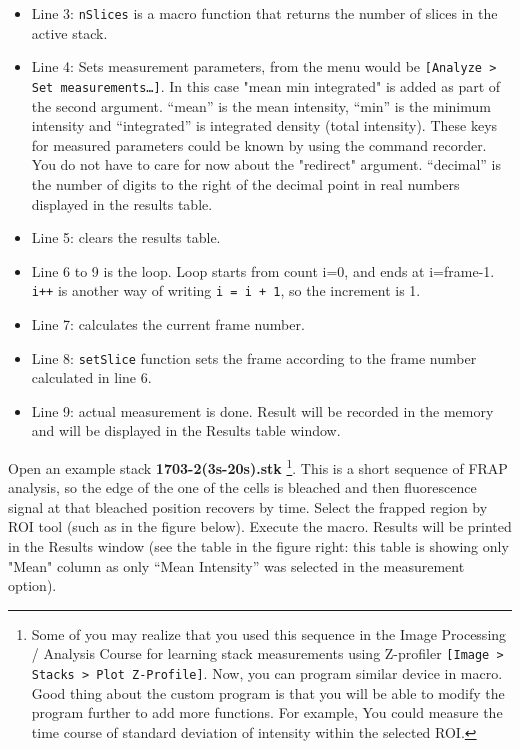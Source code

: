 \documentclass[11pt,a4paper,oneside]{report}
\newcommand{\ilcom}[1]{\texttt{\small#1}}
\begin{document}
\begin{itemize}
\item Line 3: \ilcom{nSlices} is a macro function that returns the number of slices in the active stack. 

\item Line 4: Sets measurement parameters, from the menu would be \ilcom{[Analyze > Set measurements\ldots]}. In this case "mean min integrated" is added as part of the second argument. ``mean'' is the mean intensity, ``min'' is the minimum intensity and ``integrated'' is integrated density (total intensity). These keys for measured parameters could be known by using the command recorder. 
You do not have to care for now about the "redirect" argument. ``decimal'' is the number of digits to 
the right of the decimal point in real numbers displayed in the results table. 

\item Line 5: clears the results table. 

\item Line 6 to 9 is the loop. Loop starts from count i=0, and ends at i=frame-1. \ilcom{i++} is another way of writing \ilcom{i = i + 1}, so the increment is 1.  

\item Line 7: calculates the current frame number. 

\item Line 8: \ilcom{setSlice} function sets the frame according to the frame number calculated in line 6. 

\item Line 9:  actual measurement is done. 
Result will be recorded in the memory and will be displayed in the Results table window. 
\end{itemize}

Open an example stack \textbf{1703-2(3s-20s).stk}
\footnote{Some of you may realize that you used this sequence 
in the Image Processing / Analysis Course for learning 
stack measurements using Z-profiler \ilcom{[Image > Stacks > Plot Z-Profile]}. Now, you can program similar 
device in macro. 
Good thing about the custom program
is that you will be able to modify the program further to add more functions.
For example, You could measure the time course of standard deviation of
intensity within the selected ROI.}. This is a short sequence of FRAP analysis,
so the edge of the one of the cells is bleached and then fluorescence signal at that bleached position recovers by time. 
Select the frapped region by ROI tool (such as in the figure below). 
Execute the macro. Results will be printed in the Results window (see the table in the figure right: this table is showing only "Mean" column as only ``Mean Intensity'' was selected in the measurement option). 
\end{document}
